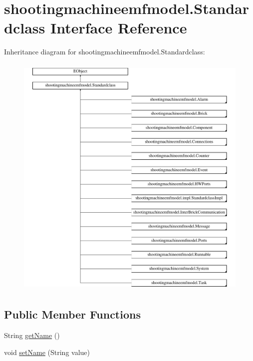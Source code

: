 \hypertarget{interfaceshootingmachineemfmodel_1_1_standardclass}{\section{shootingmachineemfmodel.\-Standardclass Interface Reference}
\label{interfaceshootingmachineemfmodel_1_1_standardclass}
}
Inheritance diagram for shootingmachineemfmodel.\-Standardclass\-:\begin{figure}[H]
\begin{center}
\leavevmode
\includegraphics[height=12.000000cm]{interfaceshootingmachineemfmodel_1_1_standardclass}
\end{center}
\end{figure}
\subsection*{Public Member Functions}
\begin{DoxyCompactItemize}
\item 
String \hyperlink{interfaceshootingmachineemfmodel_1_1_standardclass_a740f764127a9f3539b64d0a44dfb2053}{get\-Name} ()
\item 
void \hyperlink{interfaceshootingmachineemfmodel_1_1_standardclass_a985e112ac5aba503d6e8384ac9d3e9fa}{set\-Name} (String value)
\end{DoxyCompactItemize}


